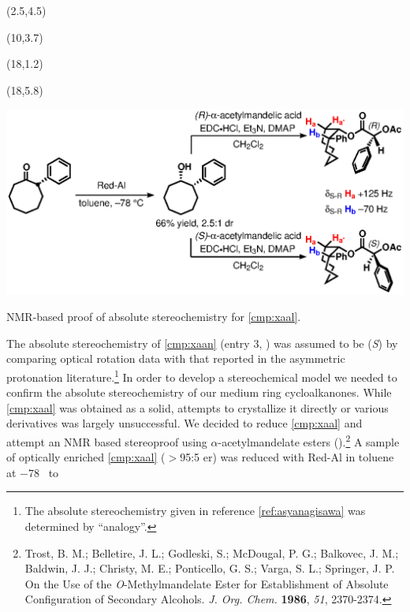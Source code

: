  \begin{Scheme}[t]
  \centering
   \begin{textblock}{1}(2.5,4.5)  \end{textblock}
   \begin{textblock}{1}(10,3.7)  \end{textblock}
      \begin{textblock}{1}(18,1.2)  \end{textblock}
   \begin{textblock}{1}(18,5.8)  \end{textblock}
  \includegraphics[scale=0.8]{chp_asymmetric/images/absolutestereochem}
  \caption{NMR-based proof of absolute stereochemistry for \ref{cmp:xaal}.}
  \label{sch:asabsolutestereochem}
\end{Scheme}
The absolute stereochemistry of \ref{cmp:xaan} (entry 3,
) was assumed to be (\textit{S}) by comparing optical rotation data with that
reported in the asymmetric protonation literature.\footnote{The absolute stereochemistry given in
reference \ref{ref:asyanagisawa} was determined by ``analogy''.}
In order to develop a stereochemical model we needed to confirm the absolute stereochemistry of our medium ring cycloalkanones.
While \ref{cmp:xaal} was obtained as a solid, attempts to crystallize it directly
or various derivatives was largely unsuccessful. We decided to reduce \ref{cmp:xaal} and attempt an
NMR based stereoproof using $\alpha$-acetylmandelate esters
().\footnote{{\frenchspacing Trost, B.
M.; Belletire, J. L.; Godleski, S.; McDougal, P. G.; Balkovec, J. M.; Baldwin, J. J.; Christy, M. E.; Ponticello, G. S.; Varga, S. L.; Springer, J. P. On the Use of the \textit{O}-Methylmandelate Ester for Establishment of Absolute Configuration of Secondary Alcohols. \textit{J. Org. Chem.} \textbf{1986}, \textit{51}, 2370-2374.}} A sample of
optically enriched \ref{cmp:xaal} ($>$95:5 er) was reduced with Red-Al in toluene at $-78$ \degc\ to

